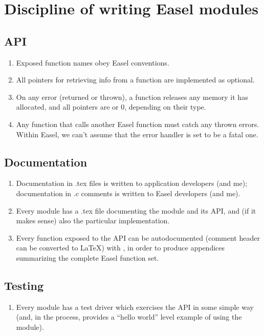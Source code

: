 \section{Discipline of writing Easel modules}


\subsection{API}

\begin{enumerate}
\item Exposed function names obey Easel conventions.

\item All  pointers for retrieving info from 
      a function are implemented as optional.

\item On any error (returned or thrown), a function releases any
      memory it has allocated, and all  pointers are
       or 0, depending on their type.

\item Any function that calls another Easel function must 
      catch any thrown errors. Within Easel, we
      can't assume that the error handler is set to be a fatal
      one.
\end{enumerate}


\subsection{Documentation}

\begin{enumerate}
\item Documentation in .tex files is written to application developers
      (and me); documentation in .c comments is written to Easel
      developers (and me).

\item Every module has a .tex file documenting the module and its API,
      and (if it makes sense) also the particular implementation.

\item Every function exposed to the API can be autodocumented (comment
      header can be converted to \LaTeX) with
      , in order to produce appendices
      summarizing the complete Easel function set.
\end{enumerate}


\subsection{Testing}

\begin{enumerate}

\item Every module has a test driver which exercises the API in some
      simple way (and, in the process, provides a ``hello world''
      level example of using the module).

\end{enumerate}










